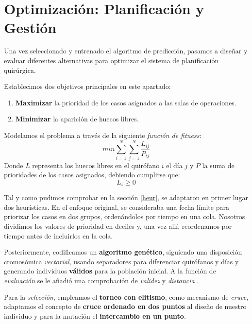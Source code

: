 
\newpage

\section{Optimización: Planificación y Gestión}


Una vez seleccionado y entrenado el algoritmo de predicción, pasamos a diseñar y evaluar diferentes alternativas para optimizar el sistema de planificación quirúrgica.

Establecimos dos objetivos principales en este apartado:
\begin{enumerate}
    \item \textbf{Maximizar} la prioridad de los casos asignados a las salas de operaciones.
    \item \textbf{Minimizar} la aparición de huecos libres.
\end{enumerate}

Modelamos el problema a través de la siguiente \textit{función de fitness}:
\begin{equation}
    min \sum_{i=1}^{N} \sum_{j=1}^{N}\frac{L_{ij}}{P_{ij}}
\end{equation}
Donde $L$ representa los huecos libres en el quirófano $i$ el día $j$ y $P$ la suma de prioridades de los casos asignados, debiendo cumplirse que:
\begin{equation}
    L_{i}\geq 0
\end{equation}

Tal y como pudimos comprobar en la sección \ref{heur}, se adaptaron en primer lugar dos heurísticas\cite{Lin2020AScheduling}. 
En el enfoque original, se consideraba una fecha límite para priorizar los casos en dos grupos, ordenándolos por tiempo en una cola. Nosotros dividimos los valores de prioridad en deciles y, una vez allí, reordenamos por tiempo antes de incluirlos en la cola.

Posteriormente, codificamos un \textbf{algoritmo genético}, siguiendo una disposición cromosómica \textit{vectorial}, usando separadores para diferenciar quirófanos y días y generando individuos \textbf{válidos} para la población inicial.
A la función de \textit{evaluación} se le añadió una comprobación de \textit{validez} y \textit{distancia} \cite{CoelloCoello2002TheoreticalArt}.

Para la \textit{selección}, empleamos el \textbf{torneo con elitismo}, como mecanismo de \textit{cruce}, adaptamos el concepto de \textbf{cruce ordenado en dos puntos} al diseño de nuestro individuo\cite{Lin2020AScheduling} y para la mutación el \textbf{intercambio en un punto}.

